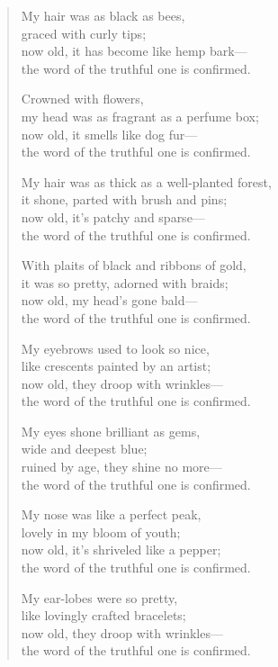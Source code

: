 \documentclass[12pt,openany]{book}%
\begin{document}
\begin{verse}%
My hair was as black as bees, \\
graced with curly tips; \\
now old, it has become like hemp bark—\\
the word of the truthful one is confirmed. 

Crowned with flowers, \\
my head was as fragrant as a perfume box; \\
now old, it smells like dog fur—\\
the word of the truthful one is confirmed. 

My hair was as thick as a well-planted forest, \\
it shone, parted with brush and pins; \\
now old, it’s patchy and sparse—\\
the word of the truthful one is confirmed. 

With plaits of black and ribbons of gold, \\
it was so pretty, adorned with braids; \\
now old, my head’s gone bald—\\
the word of the truthful one is confirmed. 

My eyebrows used to look so nice, \\
like crescents painted by an artist; \\
now old, they droop with wrinkles—\\
the word of the truthful one is confirmed. 

My eyes shone brilliant as gems, \\
wide and deepest blue; \\
ruined by age, they shine no more—\\
the word of the truthful one is confirmed. 

My nose was like a perfect peak, \\
lovely in my bloom of youth; \\
now old, it’s shriveled like a pepper; \\
the word of the truthful one is confirmed. 

My ear-lobes were so pretty, \\
like lovingly crafted bracelets; \\
now old, they droop with wrinkles—\\
the word of the truthful one is confirmed. 


\end{verse}
\end{document}
